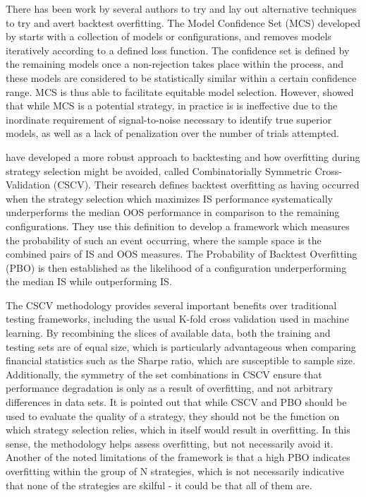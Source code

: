 \documentclass[a4paper,11pt,oneside]{article}
\theoremstyle{plain}
\theoremstyle{definition}
\begin{document}
	There has been work by several authors to try and lay out alternative techniques to try and avert backtest overfitting. 
	The Model Confidence Set (MCS) developed by \citet{Hansen} starts with a 
	collection of models or configurations, and removes models iteratively according to a defined loss function. 
	The confidence set is defined by the remaining models once a non-rejection takes place within the process, and 
	these models are considered to be statistically similar within a certain confidence range. MCS is thus able to facilitate 
	equitable model selection. However, \citet{Aparicio} showed that while MCS is a potential strategy, in 
	practice is is ineffective due to the inordinate requirement of signal-to-noise necessary to identify true superior 
	models, as well as a lack of penalization over the number of trials attempted.
	\hfill \break
	
	\citet{BailyPBO} have developed a more robust approach to backtesting and how overfitting during strategy 
	selection might be avoided, called Combinatorially Symmetric Cross-Validation (CSCV). Their research defines backtest overfitting as having occurred when the strategy selection which maximizes IS performance systematically underperforms the median OOS performance in comparison to the remaining configurations. They use this definition to develop a framework which measures the probability of such an event occurring, where the sample space is the combined pairs of IS and OOS measures. The Probability of Backtest Overfitting (PBO) is then established as the likelihood of a configuration underperforming the median IS while outperforming IS. 
	\hfill \break 
	
	The CSCV methodology provides several important benefits over traditional testing 
	frameworks, including the usual K-fold cross validation used in machine learning. By recombining the slices of 
	available data, both the training and testing sets are of equal size, which is particularly advantageous when comparing 
	financial statistics such as the Sharpe ratio, which are susceptible to sample size. Additionally, the symmetry 
	of the set combinations in CSCV ensure that performance degradation is only as a result of overfitting, and not 
	arbitrary differences in data sets. It is pointed out that while CSCV and PBO should be used to evaluate the quality 
	of a strategy, they should not be the function on which strategy selection relies, which in itself would result in overfitting. In this sense, the methodology helps assess overfitting, but not necessarily avoid it. Another of the noted limitations of the framework is 
	that a high PBO indicates overfitting within the group of N strategies, which is not necessarily indicative that none 
	of the strategies are skilful - it could be that all of them are. 
	\hfill \break 
	
\end{document}
